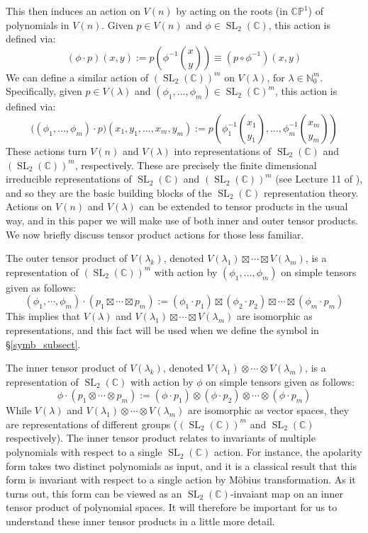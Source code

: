 \documentclass{article}
\theoremstyle{definition}
\theoremstyle{plain}
\newcommand{\C}{\mathbb{C}}
\newcommand{\N}{\mathbb{N}}
\newcommand{\CP}{\mathbb{CP}}
\DeclareMathOperator{\SL}{SL}
\begin{document}
This then induces an action on $V(n)$ by acting on the roots (in $\CP^1$) of polynomials in $V(n)$. Given $p \in V(n)$ and $\phi \in \SL_2(\C)$, this action is defined via:
\[
    (\phi \cdot p)(x,y) := p\left(\phi^{-1} \binom{x}{y}\right) \equiv (p \circ \phi^{-1})(x,y)
\]
We can define a similar action of $(\SL_2(\C))^m$ on $V(\lambda)$, for $\lambda \in \N_0^m$. Specifically, given $p \in V(\lambda)$ and $(\phi_1,\ldots,\phi_m) \in \SL_2(\C)^m$, this action is defined via:
\[
    \big((\phi_1,\ldots,\phi_m) \cdot p\big)(x_1,y_1,\ldots,x_m,y_m) := p\left(\phi_1^{-1} \binom{x_1}{y_1}, \ldots, \phi_m^{-1}\binom{x_m}{y_m}\right)
\]
These actions turn $V(n)$ and $V(\lambda)$ into representations of $\SL_2(\C)$ and $(\SL_2(\C))^m$, respectively. These are precisely the finite dimensional irreducible representations of $\SL_2(\C)$ and $(\SL_2(\C))^m$ (see Lecture 11 of \cite{fulton2013reptheory}), and so they are the basic building blocks of the $\SL_2(\C)$ representation theory. Actions on $V(n)$ and $V(\lambda)$ can be extended to tensor products in the usual way, and in this paper we will make use of both inner and outer tensor products. We now briefly discuss tensor product actions for those less familiar.

The outer tensor product of $V(\lambda_k)$, denoted $V(\lambda_1) \boxtimes \cdots \boxtimes V(\lambda_m)$, is a representation of $(\SL_2(\C))^m$ with action by $(\phi_1,\ldots,\phi_m)$ on simple tensors given as follows:
\[
    (\phi_1, \cdots, \phi_m) \cdot (p_1 \boxtimes \cdots \boxtimes p_m) := (\phi_1 \cdot p_1) \boxtimes (\phi_2 \cdot p_2) \boxtimes \cdots \boxtimes (\phi_m \cdot p_m)
\]
This implies that $V(\lambda)$ and $V(\lambda_1) \boxtimes \cdots \boxtimes V(\lambda_m)$ are isomorphic as representations, and this fact will be used when we define the symbol in \S\ref{symb_subsect}.

The inner tensor product of $V(\lambda_k)$, denoted $V(\lambda_1) \otimes \cdots \otimes V(\lambda_m)$, is a representation of $\SL_2(\C)$ with action by $\phi$ on simple tensors given as follows:
\[
    \phi \cdot (p_1 \otimes \cdots \otimes p_m) := (\phi \cdot p_1) \otimes (\phi \cdot p_2) \otimes \cdots \otimes (\phi \cdot p_m)
\]
While $V(\lambda)$ and $V(\lambda_1) \otimes \cdots \otimes V(\lambda_m)$ are isomorphic as vector spaces, they are representations of different groups ($(\SL_2(\C))^m$ and $\SL_2(\C)$ respectively). The inner tensor product relates to invariants of multiple polynomials with respect to a single $\SL_2(\C)$ action. For instance, the apolarity form takes two distinct polynomials as input, and it is a classical result that this form is invariant with respect to a single action by M{\"o}bius transformation. As it turns out, this form can be viewed as an $\SL_2(\C)$-invaiant map on an inner tensor product of polynomial spaces. It will therefore be important for us to understand these inner tensor products in a little more detail.
\end{document}
